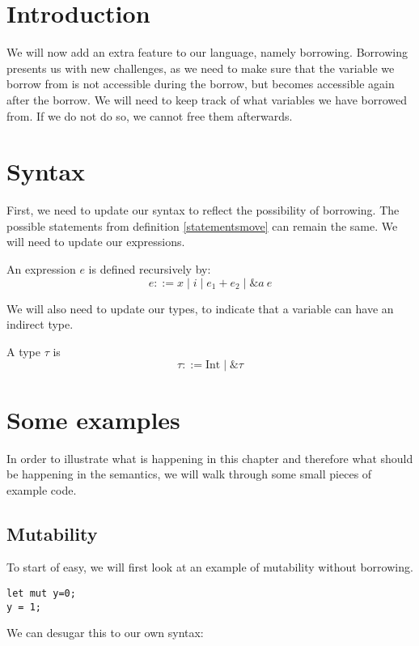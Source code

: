 \section{Introduction}
We will now add an extra feature to our language, namely borrowing. Borrowing presents us with new challenges, as we need to make sure that the variable we borrow from is not accessible during the borrow, but becomes accessible again after the borrow. We will need to keep track of what variables we have borrowed from. If we do not do so, we cannot free them afterwards. 

\section{Syntax}
First, we need to update our syntax to reflect the possibility of borrowing. The possible statements from definition \ref{statementsmove} can remain the same. We will need to update our expressions.

\begin{definition}
\label{expressionsborrow}
An expression $e$ is defined recursively by:
$$e ::= x \mid i \mid e_1 + e_2 \mid \&a~e$$
\end{definition}

We will also need to update our types, to indicate that a variable can have an indirect type.

\begin{definition}
\label{typesborrow}
A type $\tau$ is
$$\tau ::= \textrm{Int} \mid \& \tau$$
\end{definition}

\section{Some examples}

In order to illustrate what is happening in this chapter and therefore what should be happening in the semantics, we will walk through some small pieces of example code. 

\subsection{Mutability}
To start of easy, we will first look at an example of mutability without borrowing. 

\begin{verbatim}
let mut y=0;
y = 1;
\end{verbatim}

We can desugar this to our own syntax:

